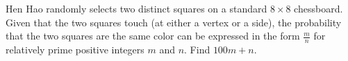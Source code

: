 Hen Hao randomly selects two distinct squares on a standard $8\times 8$ chessboard. Given that the two squares touch (at either a vertex or a side), the probability that the two squares are the same color can be expressed in the form $\frac mn$ for relatively prime positive integers $m$ and $n$. Find $100m+n$.
